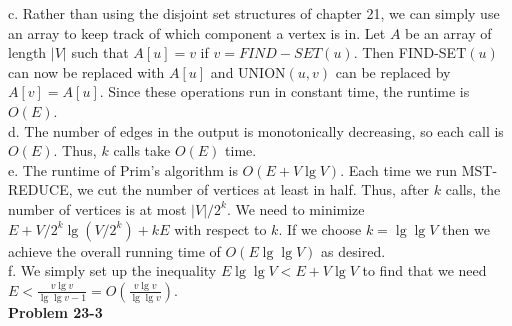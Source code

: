 \documentclass{article}
\begin{document}
c. Rather than using the disjoint set structures of chapter 21, we can simply use an array to keep track of which component a vertex is in.  Let $A$ be an array of length $|V|$ such that $A[u] = v$ if $v = FIND-SET(u)$. Then FIND-SET$(u)$ can now be replaced with $A[u]$ and UNION$(u,v)$ can be replaced by $A[v] = A[u]$.  Since these operations run in constant time, the runtime is $O(E)$. \\

d. The number of edges in the output is monotonically decreasing, so each call is $O(E)$. Thus, $k$ calls take $O(E)$ time. \\

e. The runtime of Prim's algorithm is $O(E + V\lg V)$.  Each time we run MST-REDUCE, we cut the number of vertices at least in half.  Thus, after $k$ calls, the number of vertices is at most $|V|/2^k$.  We need to minimize $E + V/2^k\lg(V/2^k) + kE$ with respect to $k$.  If we choose $k = \lg \lg V$ then we achieve the overall running time of $O(E\lg \lg V)$ as desired.  \\


f. We simply set up the inequality $E\lg \lg V < E + V\lg V$ to find that we need $E < \frac{v\lg v}{\lg \lg v - 1} = O\left(\frac{v\lg v}{\lg \lg v}\right)$. \\

\noindent\textbf{Problem 23-3}\\
\end{document}
